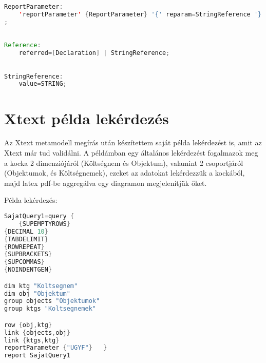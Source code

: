 \begin{lstlisting}[language=java,morekeywords={generate,dim,group,row,link,reportParameter,report,query},alsoletter={-},breaklines=true]
	
ReportParameter:
	'reportParameter' {ReportParameter} '{' reparam=StringReference '}'
;
\end{lstlisting}


\begin{lstlisting}[language=java,morekeywords={generate,dim,group,row,link,reportParameter,report,query},alsoletter={-},breaklines=true]

Reference:
	referred=[Declaration] | StringReference;

\end{lstlisting}

\begin{lstlisting}[language=java,morekeywords={generate,dim,group,row,link,reportParameter,report,query},alsoletter={-},breaklines=true]

StringReference:
	value=STRING;
\end{lstlisting}


\section{Xtext példa lekérdezés}

Az Xtext metamodell megírás után készítettem saját példa lekérdezést is, amit az
Xtext már tud validálni. A példámban egy általános lekérdezést fogalmazok meg a
kocka 2 dimenziójáról (Költségnem és Objektum), valamint 2 csoportjáról
(Objektumok, és Költségnemek), ezeket az adatokat lekérdezzük a kockából, majd
latex pdf-be aggregálva egy diagramon megjelenítjük őket.

Példa lekérdezés:
\begin{lstlisting}[language=java,morekeywords={dim,group,row,link,reportParameter,report,query},alsoletter={-},breaklines=true]
SajatQuery1=query {
	{SUPEMPTYROWS}
{DECIMAL 10}
{TABDELIMIT}
{ROWREPEAT}
{SUPBRACKETS}
{SUPCOMMAS}
{NOINDENTGEN}

dim ktg "Koltsegnem"
dim obj "Objektum"
group objects "Objektumok"
group ktgs "Koltsegnemek"

row {obj,ktg}
link {objects,obj}
link {ktgs,ktg}
reportParameter {"UGYF"}   }
report SajatQuery1
\end{lstlisting}